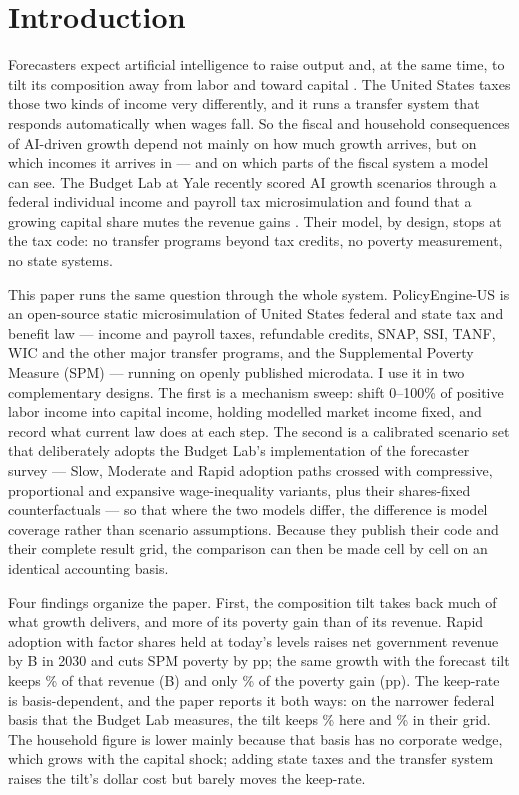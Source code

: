 \section{Introduction}\label{sec:intro}

Forecasters expect artificial intelligence to raise output and, at the same
time, to tilt its composition away from labor and toward capital
\citep{karger2026}. The United States taxes those two kinds of income very
differently, and it runs a transfer system that responds automatically when
wages fall. So the fiscal and household consequences of AI-driven growth
depend not mainly on how much growth arrives, but on which incomes it arrives
in --- and on which parts of the fiscal system a model can see. The Budget
Lab at Yale recently scored AI growth scenarios through a federal individual
income and payroll tax microsimulation and found that a growing capital share
mutes the revenue gains \citep{iselinnunn2026}. Their model, by design, stops
at the tax code: no transfer programs beyond tax credits, no poverty
measurement, no state systems.

This paper runs the same question through the whole system. PolicyEngine-US
is an open-source static microsimulation of United States federal and state
tax and benefit law --- income and payroll taxes, refundable credits, SNAP,
SSI, TANF, WIC and the other major transfer programs, and the Supplemental
Poverty Measure (SPM) --- running on openly published microdata. I use it in
two complementary designs. The first is a mechanism sweep: shift 0--100\% of
positive labor income into capital income, holding modelled market income
fixed, and record what current law does at each step. The second is a
calibrated scenario set that deliberately adopts the Budget Lab's
implementation of the \citet{karger2026} forecaster survey --- Slow, Moderate
and Rapid adoption paths crossed with compressive, proportional and expansive
wage-inequality variants, plus their shares-fixed counterfactuals --- so that
where the two models differ, the difference is model coverage rather than
scenario assumptions. Because they publish their code and their complete
result grid, the comparison can then be made cell by cell on an identical
accounting basis.

Four findings organize the paper. First, the composition tilt takes back much
of what growth delivers, and more of its poverty gain than of its revenue.
Rapid adoption with factor
shares held at today's levels raises net government revenue by
\genRapidFixedRev B in 2030 and cuts SPM poverty by
\genRapidFixedPovPp pp; the same growth with the forecast tilt keeps
\genKeptHouseholdRapidPct\% of that revenue (\genRapidPropRev B) and only
\genRapidPovGainKeptPct\% of the poverty gain (\genRapidPropPovPp pp). The keep-rate
is basis-dependent, and the paper reports it both ways: on the narrower
federal basis that the Budget Lab measures, the tilt keeps
\genKeptMatchedRapidPct\% here and \genKeptTheirsRapidPct\% in their grid.
The household figure is lower mainly because that basis has no corporate
wedge, which grows with the capital shock; adding state taxes and the
transfer system raises the tilt's dollar cost but barely moves the keep-rate.

